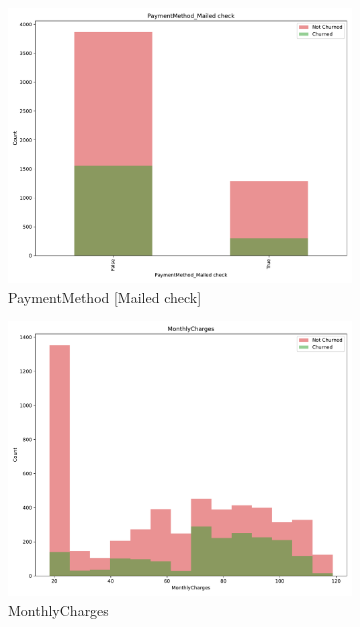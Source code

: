 \documentclass[a4paper,11pt]{article}
\begin{document}
\begin{landscape}
\begin{figure}
\begin{subfigure}{0.14\linewidth}
    \includegraphics[width=\linewidth]{figures/understanding/PaymentMethod_Mailed check.pdf}
    \caption{PaymentMethod [Mailed check]}
\end{subfigure}
\begin{subfigure}{0.14\linewidth}
    \includegraphics[width=\linewidth]{figures/understanding/MonthlyCharges.pdf}
    \caption{MonthlyCharges}
\end{subfigure}
\begin{subfigure}{0.14\linewidth}

\end{subfigure}
\end{figure}
\end{landscape}
\end{document}

